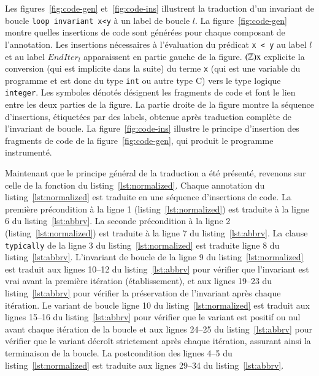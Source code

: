 Les figures~\ref{fig:code-gen} et~\ref{fig:code-ins} illustrent la traduction
d'un invariant de boucle \lstinline'loop invariant x<y' à un label de boucle
$l$.
La figure~\ref{fig:code-gen} montre quelles insertions de code sont générées
pour chaque composant de l'annotation.
Les insertions nécessaires à l'évaluation du prédicat \lstinline'x < y' au
label $l$ et au label $\mathit{EndIter_l}$ apparaissent en partie gauche de la
figure.
$(\mathbb{Z})\mbox{\lstinline'x'}$ explicite la conversion (qui est implicite
dans la suite) du terme \lstinline'x' (qui est une variable du programme et est
donc du type \lstinline'int' ou autre type C) vers le type logique
\lstinline'integer'.
Les symboles dénotés 
désignent les fragments de code et font le lien entre les deux parties de la
figure.
La partie droite de la figure montre la séquence d'insertions, étiquetées par
des labels, obtenue après traduction complète de l'invariant de boucle.
La figure~\ref{fig:code-ins} illustre le principe d'insertion des fragments de
code de la figure~\ref{fig:code-gen}, qui produit le programme instrumenté.


Maintenant que le principe général de la traduction a été présenté, revenons
sur celle de la fonction du listing~\ref{lst:normalized}.
Chaque annotation du listing~\ref{lst:normalized} est traduite en une séquence
d'insertions de code.
La première précondition à la ligne 1 (listing~\ref{lst:normalized}) est
traduite à la ligne 6 du listing~\ref{lst:abbrv}.
La seconde précondition à la ligne 2 (listing~\ref{lst:normalized}) est
traduite à la ligne 7 du listing~\ref{lst:abbrv}.
La clause \lstinline'typically' de la ligne 3 du listing~\ref{lst:normalized}
est traduite ligne 8 du listing~\ref{lst:abbrv}.
L'invariant de boucle de la ligne 9 du listing~\ref{lst:normalized} est traduit
aux lignes 10--12 du listing~\ref{lst:abbrv} pour vérifier que l'invariant est
vrai avant la première itération (établissement), et aux lignes 19--23 du
listing~\ref{lst:abbrv} pour vérifier la préservation de l'invariant après
chaque itération.
Le variant de boucle ligne 10 du listing~\ref{lst:normalized} est traduit aux
lignes 15--16 du listing~\ref{lst:abbrv} pour vérifier que le variant est
positif ou nul avant chaque itération de la boucle et aux lignes 24--25 du
listing~\ref{lst:abbrv} pour vérifier que le
variant décroît strictement après chaque itération, assurant ainsi la
terminaison de la boucle.
La postcondition des lignes 4--5 du listing~\ref{lst:normalized} est traduite
aux lignes 29--34 du listing~\ref{lst:abbrv}.

